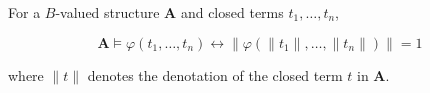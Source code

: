 For a $B$-valued structure $\mathbf{A}$ and closed terms $t_1, \ldots, t_n$,

$$\mathbf{A} \models \varphi(t_1, \ldots, t_n) \leftrightarrow \|\varphi(\|t_1\|, \ldots, \|t_n\|)\| = 1$$

where $\|t\|$ denotes the denotation of the closed term $t$ in $\mathbf{A}$.
